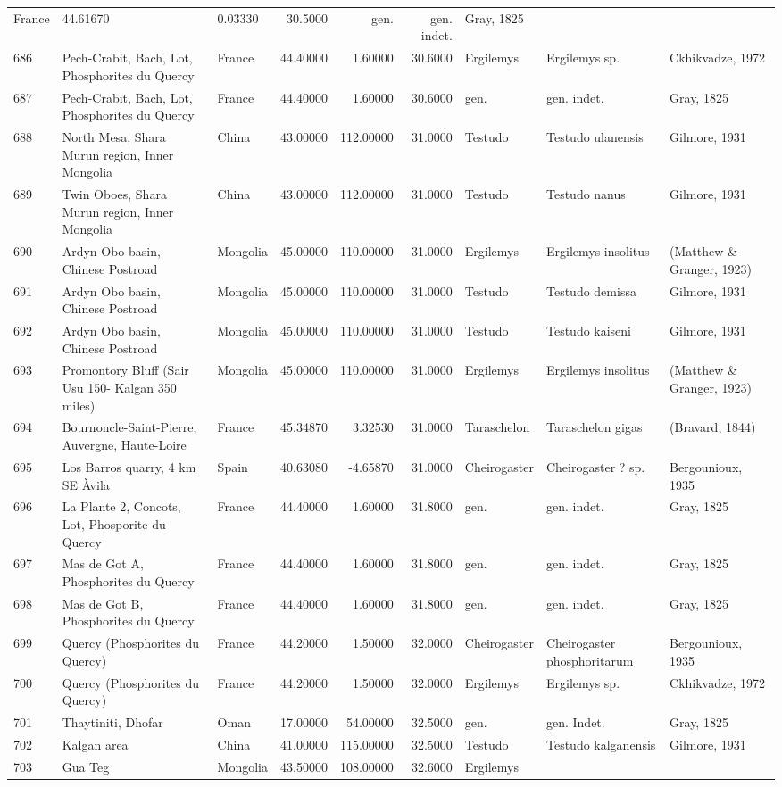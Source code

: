 \documentclass[]{article}
\begin{document}
\begin{longtable}[]{@{}lllrrrlll@{}}
France & 44.61670 & 0.03330 & 30.5000 & gen. & gen. indet. & Gray,
1825\tabularnewline
686 & Pech-Crabit, Bach, Lot, Phosphorites du Quercy & France & 44.40000
& 1.60000 & 30.6000 & Ergilemys & Ergilemys sp. & Ckhikvadze,
1972\tabularnewline
687 & Pech-Crabit, Bach, Lot, Phosphorites du Quercy & France & 44.40000
& 1.60000 & 30.6000 & gen. & gen. indet. & Gray, 1825\tabularnewline
688 & North Mesa, Shara Murun region, Inner Mongolia & China & 43.00000
& 112.00000 & 31.0000 & Testudo & Testudo ulanensis & Gilmore,
1931\tabularnewline
689 & Twin Oboes, Shara Murun region, Inner Mongolia & China & 43.00000
& 112.00000 & 31.0000 & Testudo & Testudo nanus & Gilmore,
1931\tabularnewline
690 & Ardyn Obo basin, Chinese Postroad & Mongolia & 45.00000 &
110.00000 & 31.0000 & Ergilemys & Ergilemys insolitus & (Matthew \&
Granger, 1923)\tabularnewline
691 & Ardyn Obo basin, Chinese Postroad & Mongolia & 45.00000 &
110.00000 & 31.0000 & Testudo & Testudo demissa & Gilmore,
1931\tabularnewline
692 & Ardyn Obo basin, Chinese Postroad & Mongolia & 45.00000 &
110.00000 & 31.0000 & Testudo & Testudo kaiseni & Gilmore,
1931\tabularnewline
693 & Promontory Bluff (Sair Usu 150- Kalgan 350 miles) & Mongolia &
45.00000 & 110.00000 & 31.0000 & Ergilemys & Ergilemys insolitus &
(Matthew \& Granger, 1923)\tabularnewline
694 & Bournoncle-Saint-Pierre, Auvergne, Haute-Loire & France & 45.34870
& 3.32530 & 31.0000 & Taraschelon & Taraschelon gigas & (Bravard,
1844)\tabularnewline
695 & Los Barros quarry, 4 km SE Àvila & Spain & 40.63080 & -4.65870 &
31.0000 & Cheirogaster & Cheirogaster ? sp. & Bergounioux,
1935\tabularnewline
696 & La Plante 2, Concots, Lot, Phosporite du Quercy & France &
44.40000 & 1.60000 & 31.8000 & gen. & gen. indet. & Gray,
1825\tabularnewline
697 & Mas de Got A, Phosphorites du Quercy & France & 44.40000 & 1.60000
& 31.8000 & gen. & gen. indet. & Gray, 1825\tabularnewline
698 & Mas de Got B, Phosphorites du Quercy & France & 44.40000 & 1.60000
& 31.8000 & gen. & gen. indet. & Gray, 1825\tabularnewline
699 & Quercy (Phosphorites du Quercy) & France & 44.20000 & 1.50000 &
32.0000 & Cheirogaster & Cheirogaster phosphoritarum & Bergounioux,
1935\tabularnewline
700 & Quercy (Phosphorites du Quercy) & France & 44.20000 & 1.50000 &
32.0000 & Ergilemys & Ergilemys sp. & Ckhikvadze, 1972\tabularnewline
701 & Thaytiniti, Dhofar & Oman & 17.00000 & 54.00000 & 32.5000 & gen. &
gen. Indet. & Gray, 1825\tabularnewline
702 & Kalgan area & China & 41.00000 & 115.00000 & 32.5000 & Testudo &
Testudo kalganensis & Gilmore, 1931\tabularnewline
703 & Gua Teg & Mongolia & 43.50000 & 108.00000 & 32.6000 & Ergilemys &

\end{longtable}
\end{document}
